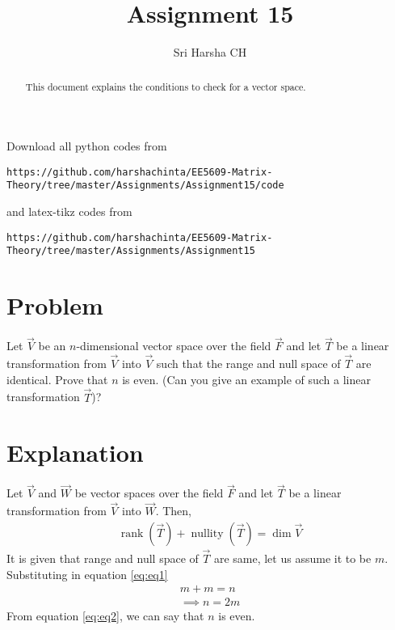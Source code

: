 \documentclass[journal,12pt,twocolumn]{IEEEtran}
\DeclareMathOperator{\rank}{rank}
\DeclareMathOperator{\nullity}{nullity}
\begin{document}
\renewcommand{\thefigure}{\theproblem}

\def\putbox#1#2#3{\makebox[0in][l]{\makebox[#1][l]{}\raisebox{\baselineskip}[0in][0in]{\raisebox{#2}[0in][0in]{#3}}}}
     \def\rightbox#1{\makebox[0in][r]{#1}}
     \def\centbox#1{\makebox[0in]{#1}}
     \def\topbox#1{\raisebox{-\baselineskip}[0in][0in]{#1}}
     \def\midbox#1{\raisebox{-0.5\baselineskip}[0in][0in]{#1}}
\vspace{3cm}
\title{Assignment 15}
\author{Sri Harsha CH}

\maketitle
\newpage

\bigskip
\renewcommand{\thefigure}{\theenumi}
\renewcommand{\thetable}{\theenumi}

\begin{abstract}
This document explains the conditions to check for a vector space. 
\end{abstract}

Download all python codes from 
\begin{lstlisting}
https://github.com/harshachinta/EE5609-Matrix-Theory/tree/master/Assignments/Assignment15/code
\end{lstlisting}
%
and latex-tikz codes from 
%
\begin{lstlisting}
https://github.com/harshachinta/EE5609-Matrix-Theory/tree/master/Assignments/Assignment15
\end{lstlisting}
%
\section{Problem}
Let $\vec{V}$ be an $n$-dimensional vector space over the field $\vec{F}$ and let $\vec{T}$ be a linear transformation from $\vec{V}$ into $\vec{V}$ such that the range and null space of $\vec{T}$ are identical. Prove that $n$ is even. (Can you give an example of such a linear transformation $\vec{T}$)?
\section{Explanation}
Let $\vec{V}$ and $\vec{W}$ be vector spaces over the field $\vec{F}$ and let $\vec{T}$ be a linear transformation from $\vec{V}$ into $\vec{W}$. Then,
\begin{align}
    \rank (\vec{T}) + \nullity (\vec{T}) = \dim \vec{V} \label{eq:eq1}
\end{align}
It is given that range and null space of $\vec{T}$ are same, let us assume it to be $m$.
Substituting in equation \eqref{eq:eq1}
\begin{align}
    m + m = n\\
\implies n = 2m \label{eq:eq2}
\end{align}
From equation \eqref{eq:eq2}, we can say that $n$ is even.\\
\end{document}

